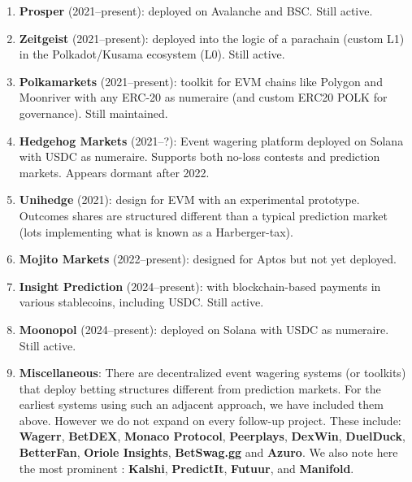 \begin{enumerate}
\item \textbf{Prosper} (2021--present): \depm deployed on Avalanche and BSC. Still active.

\item \textbf{Zeitgeist} (2021--present): \depm deployed into the logic of a parachain (custom L1) in the Polkadot/Kusama ecosystem (L0). Still active.

\item \textbf{Polkamarkets} (2021--present): \depm toolkit for EVM chains like Polygon and Moonriver with any ERC-20 as numeraire (and custom ERC20 POLK for governance). Still maintained.

\item \textbf{Hedgehog Markets} (2021--?): Event wagering platform deployed on Solana with USDC as numeraire. Supports both no-loss contests and prediction markets. Appears dormant after 2022.

\item \textbf{Unihedge} (2021): \depm design for EVM with an experimental prototype. Outcomes shares are structured different than a typical prediction market (lots implementing what is known as a Harberger-tax).

\item \textbf{Mojito Markets} (2022--present): \depm designed for Aptos but not yet deployed.

\item \textbf{Insight Prediction} (2024--present): \cepm with blockchain-based payments in various stablecoins, including USDC. Still active.

\item \textbf{Moonopol} (2024--present): \depm deployed on Solana with USDC as numeraire. Still active.

\item \textbf{Miscellaneous}: There are decentralized event wagering systems (or toolkits) that deploy betting structures different from prediction markets. For the earliest systems using such an adjacent approach, we have included them above. However we do not expand on every follow-up project. These include: \textbf{Wagerr}, \textbf{BetDEX}, \textbf{Monaco Protocol}, \textbf{Peerplays}, \textbf{DexWin}, \textbf{DuelDuck}, \textbf{BetterFan}, \textbf{Oriole Insights}, \textbf{BetSwag.gg} and \textbf{Azuro}. We also note here the most prominent \cepms: \textbf{Kalshi}, \textbf{PredictIt}, \textbf{Futuur}, and \textbf{Manifold}. 

\end{enumerate}



